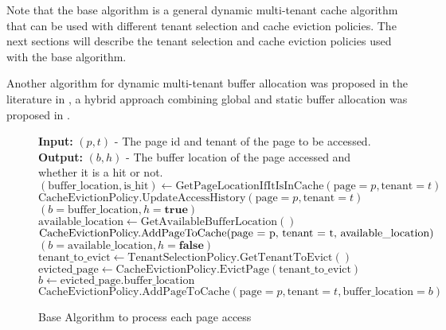 Note that the base algorithm is a general dynamic multi-tenant cache algorithm that can 
be used with different tenant selection and cache eviction policies. The next sections 
will describe the tenant selection and cache eviction policies used with the base algorithm.

Another algorithm for dynamic multi-tenant buffer allocation was proposed in the 
literature in \cite{buffer-sharing-1}, a hybrid approach combining global and static 
buffer allocation was proposed in \cite{article-for-2level-forecasting}.

\begin{figure}[htbp]
    \centering
    \begin{minipage}{\linewidth}
    \begin{algorithm}[H]
        \caption{Base Algorithm to process each page access}
        \begin{algorithmic}
            \STATE \textbf{Input:} $(p, t)$ - The page id and tenant of the page to be accessed.
            \STATE \textbf{Output:} $(b, h)$ - The buffer location of the page accessed and whether it is a hit or not.
            \STATE
            \STATE $(\text{buffer\_location}, \text{is\_hit}) \leftarrow \text{GetPageLocationIfItIsInCache}(\text{page} = p, \text{tenant} = t)$
                \STATE $\text{CacheEvictionPolicy.UpdateAccessHistory}(\text{page} = p, \text{tenant} = t)$
                \RETURN $(b = \text{buffer\_location}, h = \textbf{true})$
            \ELSE
                \STATE {}
                    \STATE $\text{available\_location} \leftarrow \text{GetAvailableBufferLocation}()$ 
                    \STATE $\text{CacheEvictionPolicy.AddPageToCache(\text{page} = p, \text{tenant} = t, \text{available\_location})}$
                    \RETURN $(b = \text{available\_location}, h = \textbf{false})$
                \ELSE
                    \STATE {}
                    \STATE $\text{tenant\_to\_evict} \leftarrow \text{TenantSelectionPolicy.GetTenantToEvict}()$
                    \STATE $\text{evicted\_page} \leftarrow \text{CacheEvictionPolicy.EvictPage}(\text{tenant\_to\_evict})$
                    \STATE $b \leftarrow \text{evicted\_page.buffer\_location}$
                    \STATE $\text{CacheEvictionPolicy.AddPageToCache}(\text{page} = p, \text{tenant} = t, \text{buffer\_location} = b)$

\end{algorithmic}
\end{algorithm}
\end{minipage}
\end{figure}
